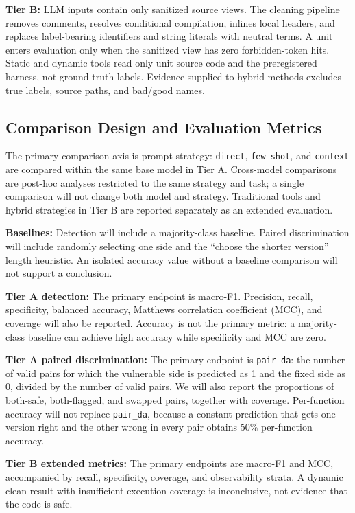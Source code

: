 \documentclass[conference]{IEEEtran}
\begin{document}
\textbf{Tier B:} LLM inputs contain only sanitized source views. The cleaning pipeline removes comments, resolves conditional compilation, inlines local headers, and replaces label-bearing identifiers and string literals with neutral terms. A unit enters evaluation only when the sanitized view has zero forbidden-token hits. Static and dynamic tools read only unit source code and the preregistered harness, not ground-truth labels. Evidence supplied to hybrid methods excludes true labels, source paths, and bad/good names.

\subsection{Comparison Design and Evaluation Metrics}
\label{sec:eval-design}

The primary comparison axis is prompt strategy: \texttt{direct}, \texttt{few-shot}, and \texttt{context} are compared within the same base model in Tier A. Cross-model comparisons are post-hoc analyses restricted to the same strategy and task; a single comparison will not change both model and strategy. Traditional tools and hybrid strategies in Tier B are reported separately as an extended evaluation.

\textbf{Baselines:} Detection will include a majority-class baseline. Paired discrimination will include randomly selecting one side and the ``choose the shorter version'' length heuristic. An isolated accuracy value without a baseline comparison will not support a conclusion.

\textbf{Tier A detection:} The primary endpoint is macro-F1. Precision, recall, specificity, balanced accuracy, Matthews correlation coefficient (MCC), and coverage will also be reported. Accuracy is not the primary metric: a majority-class baseline can achieve high accuracy while specificity and MCC are zero.

\textbf{Tier A paired discrimination:} The primary endpoint is \texttt{pair\_da}: the number of valid pairs for which the vulnerable side is predicted as 1 and the fixed side as 0, divided by the number of valid pairs. We will also report the proportions of both-safe, both-flagged, and swapped pairs, together with coverage. Per-function accuracy will not replace \texttt{pair\_da}, because a constant prediction that gets one version right and the other wrong in every pair obtains 50\% per-function accuracy.

\textbf{Tier B extended metrics:} The primary endpoints are macro-F1 and MCC, accompanied by recall, specificity, coverage, and observability strata. A dynamic clean result with insufficient execution coverage is inconclusive, not evidence that the code is safe.
\end{document}
